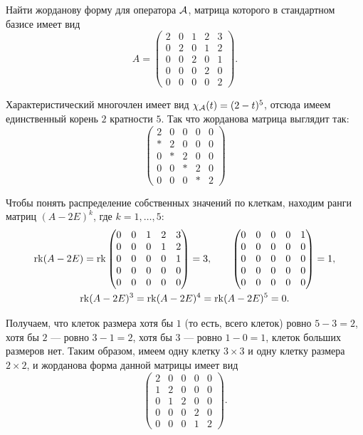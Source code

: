 \begin{problem}
	Найти жорданову форму для оператора $\mathcal{A}$, матрица которого в стандартном базисе имеет вид
	\[
		A =
		\begin{pmatrix}
			2 & 0 & 1 & 2 & 3\\
			0 & 2 & 0 & 1 & 2\\
			0 & 0 & 2 & 0 & 1\\
			0 & 0 & 0 & 2 & 0\\
			0 & 0 & 0 & 0 & 2
		\end{pmatrix}.
	\]
\end{problem}

\begin{solution}
	Характеристический многочлен имеет вид $\chi_{\mathcal{A}}(t) = (2 - t)^5$, отсюда имеем единственный корень $2$ кратности $5$. Так что жорданова матрица выглядит так:
	\[
		\begin{pmatrix}
			2 & 0 & 0 & 0 & 0\\
			\ast & 2 & 0 & 0 & 0\\
			0 & \ast & 2 & 0 & 0\\
			0 & 0 & \ast & 2 & 0\\
			0 & 0 & 0 & \ast & 2
		\end{pmatrix}
	\]

	Чтобы понять распределение собственных значений по клеткам, находим ранги матриц $(A - 2E)^k$, где $k = 1, \ldots, 5$:
	\begin{gather*}
		\operatorname{rk}(A - 2E) = \operatorname{rk}
		\begin{pmatrix}
			0 & 0 & 1 & 2 & 3\\
			0 & 0 & 0 & 1 & 2\\
			0 & 0 & 0 & 0 & 1\\
			0 & 0 & 0 & 0 & 0\\
			0 & 0 & 0 & 0 & 0
		\end{pmatrix} = 3,\qquad
		\begin{pmatrix}
			0 & 0 & 0 & 0 & 1\\
			0 & 0 & 0 & 0 & 0\\
			0 & 0 & 0 & 0 & 0\\
			0 & 0 & 0 & 0 & 0\\
			0 & 0 & 0 & 0 & 0
		\end{pmatrix} = 1,\\
		\operatorname{rk}(A - 2E)^3 = \operatorname{rk}(A - 2E)^4 = \operatorname{rk}(A - 2E)^5 = 0.
	\end{gather*}

	Получаем, что клеток размера хотя бы $1$ (то есть, всего клеток) ровно $5 - 3 = 2$, хотя бы $2$ --- ровно $3 - 1 = 2$, хотя бы $3$ --- ровно $1 - 0 = 1$, клеток больших размеров нет. Таким образом, имеем одну клетку $3 \times 3$ и одну клетку размера $2 \times 2$, и жорданова форма данной матрицы имеет вид
	\[
		\begin{pmatrix}
			2 & 0 & 0 & 0 & 0\\
			1 & 2 & 0 & 0 & 0\\
			0 & 1 & 2 & 0 & 0\\
			0 & 0 & 0 & 2 & 0\\
			0 & 0 & 0 & 1 & 2
		\end{pmatrix}.
	\]
\end{solution}

